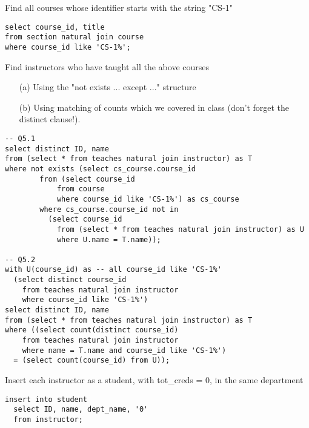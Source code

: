 \documentclass[logo,reportComp]{thesis}
\begin{document}
\begin{question}
\normalfont 
Find all courses whose identifier starts with the string "CS-1"
\end{question}
\begin{answer}\mbox{}\par
\begin{lstlisting}
select course_id, title
from section natural join course
where course_id like 'CS-1%';
\end{lstlisting}
\end{answer}

\begin{question}
\normalfont 
Find instructors who have taught all the above courses
\begin{itemize}
\item [(a)] Using the "not exists ... except ..." structure
\item [(b)] Using matching of counts which we covered in class (don't forget the distinct clause!).
\end{itemize}
\end{question}
\begin{answer}\mbox{}\par
\begin{lstlisting}
-- Q5.1
select distinct ID, name
from (select * from teaches natural join instructor) as T
where not exists (select cs_course.course_id
        from (select course_id
            from course
            where course_id like 'CS-1%') as cs_course
        where cs_course.course_id not in
          (select course_id
            from (select * from teaches natural join instructor) as U
            where U.name = T.name));

-- Q5.2
with U(course_id) as -- all course_id like 'CS-1%'
  (select distinct course_id
    from teaches natural join instructor
    where course_id like 'CS-1%')
select distinct ID, name
from (select * from teaches natural join instructor) as T
where ((select count(distinct course_id)
    from teaches natural join instructor
    where name = T.name and course_id like 'CS-1%')
  = (select count(course_id) from U));
\end{lstlisting}
\end{answer}

\begin{question}
\normalfont 
Insert each instructor as a student, with tot\_creds = 0, in the same department
\end{question}
\begin{answer}\mbox{}\par
\begin{lstlisting}
insert into student
  select ID, name, dept_name, '0'
  from instructor;
\end{lstlisting}
\end{answer}
\end{document}
